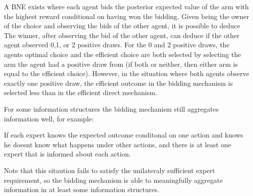 A BNE exists where each agent bids the posterior expected value of the arm with the highest reward conditional on having won the bidding.
Given being the owner of the choice and observing the bids of the other agent, it is possible to deduce 
The winner, after observing the bid of the other agent, can deduce if the other agent observed 0,1, or 2 positive draws. For the 0 and 2 positive draws, the agents optimal choice and the efficient choice are both selected by selecting the arm the agent had a positive draw from (if both or neither, then either arm is equal to the efficient choice). 
However, in the situation where both agents observe exactly one positive draw, the efficient outcome in the bidding mechanism is selected less than in the efficient direct mechanism.


For some information structures the bidding mechanism still aggregates information well, for example:

\begin{defn}
	If each expert knows the expected outcome conditonal on one action and knows he doesnt know what happens under other actions, and there is at least one expert that is informed about each action.
\end{defn}

Note that this sitaution fails to satisfy the unilateraly sufficient expert requirement, so the bidding mechanism is able to meaningfully aggregate information in at least some information structures. 










